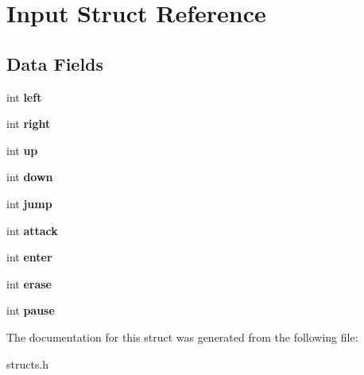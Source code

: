 \hypertarget{structInput}{}\section{Input Struct Reference}
\label{structInput}
\subsection*{Data Fields}
\begin{DoxyCompactItemize}
\item 
\mbox{\label{structInput_aa5becba821fbe9c146c332091ebcc6f2}} 
int {\bfseries left}
\item 
\mbox{\label{structInput_a481ae9265fafe80dad6850a24980bfb5}} 
int {\bfseries right}
\item 
\mbox{\label{structInput_ad83fb715e39bdc509caf1c2bb7bf692d}} 
int {\bfseries up}
\item 
\mbox{\label{structInput_a24c4a5d08fb4de9300931efb8e7787fb}} 
int {\bfseries down}
\item 
\mbox{\label{structInput_a02196046bee72669d3fb90a36000d157}} 
int {\bfseries jump}
\item 
\mbox{\label{structInput_a64f7d1faac36dc0a2e8096b7d3c1e7fc}} 
int {\bfseries attack}
\item 
\mbox{\label{structInput_a9488321c43ebd88cafa3720ac2d964b9}} 
int {\bfseries enter}
\item 
\mbox{\label{structInput_abc3ed73c809a9f920d730576671b7abd}} 
int {\bfseries erase}
\item 
\mbox{\label{structInput_a59c3cea350441855b46a19411e8893b6}} 
int {\bfseries pause}
\end{DoxyCompactItemize}


The documentation for this struct was generated from the following file\+:\begin{DoxyCompactItemize}
\item 
structs.\+h\end{DoxyCompactItemize}
